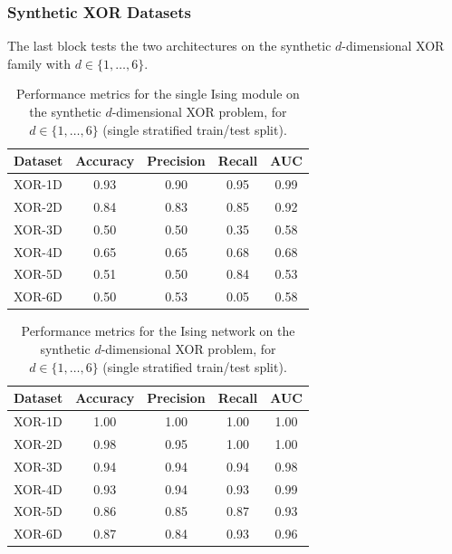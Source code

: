 \documentclass{ieeeaccess}
\begin{document}
\subsubsection{Synthetic XOR Datasets}\label{sec:res_xor}

The last block tests the two architectures on the synthetic
$d$-dimensional XOR family with $d \in \{1,\dots,6\}$.

\begin{table}[H]
\centering
\caption{Performance metrics for the single Ising module on the synthetic
$d$-dimensional XOR problem, for $d \in \{1,\dots,6\}$ (single stratified
train/test split).}
\label{tab:ising_xor}
\begin{tabular}{lcccc}
\hline
Dataset & Accuracy & Precision & Recall & AUC    \\
\hline
XOR-1D  & 0.93     & 0.90      & 0.95   & 0.99 \\
XOR-2D  & 0.84     & 0.83      & 0.85   & 0.92 \\
XOR-3D  & 0.50     & 0.50      & 0.35   & 0.58 \\
XOR-4D  & 0.65     & 0.65      & 0.68   & 0.68 \\
XOR-5D  & 0.51     & 0.50      & 0.84   & 0.53 \\
XOR-6D  & 0.50     & 0.53      & 0.05   & 0.58 \\
\hline
\end{tabular}
\end{table}

\begin{table}[H]
\centering
\caption{Performance metrics for the Ising network on the synthetic
$d$-dimensional XOR problem, for $d \in \{1,\dots,6\}$ (single stratified
train/test split).}
\label{tab:nn_xor}
\begin{tabular}{lcccc}
\hline
Dataset & Accuracy & Precision & Recall & AUC    \\
\hline
XOR-1D  & 1.00     & 1.00      & 1.00   & 1.00 \\
XOR-2D  & 0.98     & 0.95      & 1.00   & 1.00 \\
XOR-3D  & 0.94     & 0.94      & 0.94   & 0.98 \\
XOR-4D  & 0.93     & 0.94      & 0.93   & 0.99 \\
XOR-5D  & 0.86     & 0.85      & 0.87   & 0.93 \\
XOR-6D  & 0.87     & 0.84      & 0.93   & 0.96 \\
\hline
\end{tabular}
\end{table}
\end{document}
